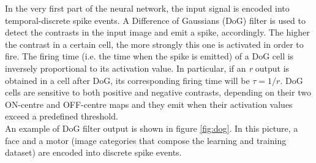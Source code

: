 \documentclass[11pt,a4paper]{scrartcl}
\begin{document}
In the very first part of the neural network, the input signal is encoded into temporal-discrete spike events. A Difference of Gaussians (DoG) filter is used to detect the contrasts in the input image and emit a spike, accordingly. The higher the contrast in a certain cell, the more strongly this one is activated in order to fire. The firing time (i.e. the time when the spike is emitted) of a DoG cell is inversely proportional to its activation value. In particular, if an \textit{r} output is obtained in a cell after DoG, its corresponding firing time will be $ \tau = 1/r $. DoG cells are sensitive to both positive and negative contrasts, depending on their two ON-centre and OFF-centre maps and they emit when their activation values exceed a predefined threshold.\\
An example of DoG filter output is shown in figure \ref*{fig:dog}. In this picture, a face and a motor (image categories that compose the learning and training dataset) are encoded into discrete spike events.\\
\end{document}
